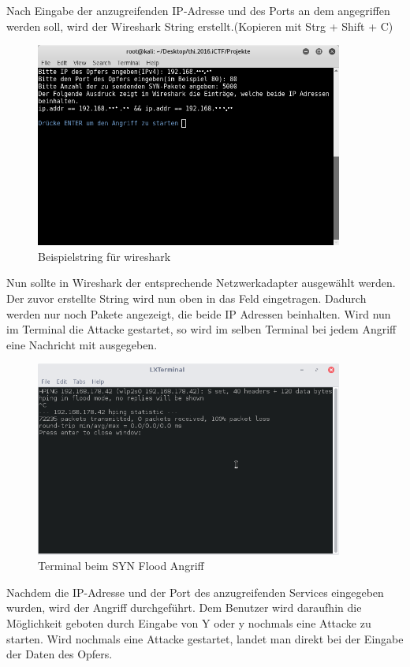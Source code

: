 Nach Eingabe der anzugreifenden IP-Adresse und des Ports an dem angegriffen werden soll, wird der Wireshark String erstellt.(Kopieren mit Strg + Shift + C)
	\begin{figure}[H]
		\centering
		\includegraphics[width=0.9\textwidth]{images/dos/wireshark_string.png}
		\caption{Beispielstring für wireshark}
		\label{fig:wireshark string}
	\end{figure}
Nun sollte in Wireshark der entsprechende Netzwerkadapter ausgewählt werden. Der zuvor erstellte String wird nun oben in das Feld eingetragen. Dadurch werden nur noch Pakete angezeigt, die beide IP Adressen beinhalten.
Wird nun im Terminal die Attacke gestartet, so wird im selben Terminal bei jedem Angriff eine Nachricht mit ausgegeben.
	\begin{figure}[H]
		\centering
		\includegraphics[width=0.9\textwidth]{images/dos/dos_syn_hping3_attack.png}
		\caption{Terminal beim SYN Flood Angriff}
		\label{fig:synattack example}
	\end{figure}
Nachdem die IP-Adresse und der Port des anzugreifenden Services eingegeben wurden, wird der Angriff durchgeführt.
Dem Benutzer wird daraufhin die Möglichkeit geboten durch Eingabe von Y oder y nochmals eine Attacke zu starten.
Wird nochmals eine Attacke gestartet, landet man direkt bei der Eingabe der Daten des Opfers. 


